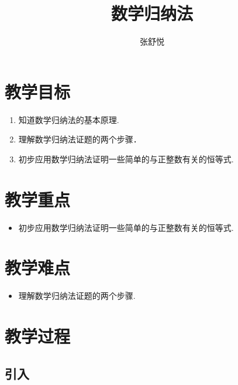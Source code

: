 \documentclass{article}
\begin{document}
\begin{CJK}{UTF8}{gkai}

\title{数学归纳法}
\date{}
\author{张舒悦}
\maketitle
       
\section{教学目标}
\begin{enumerate}
\item 知道数学归纳法的基本原理.
\item 理解数学归纳法证题的两个步骤．
\item 初步应用数学归纳法证明一些简单的与正整数有关的恒等式.
\end{enumerate}

\section{教学重点}
\begin{itemize}
\item 初步应用数学归纳法证明一些简单的与正整数有关的恒等式.
\end{itemize}

\section{教学难点}
\begin{itemize}
\item  理解数学归纳法证题的两个步骤.
\end{itemize}

\section{教学过程}
\subsection{引入}

\end{CJK}
\end{document}
